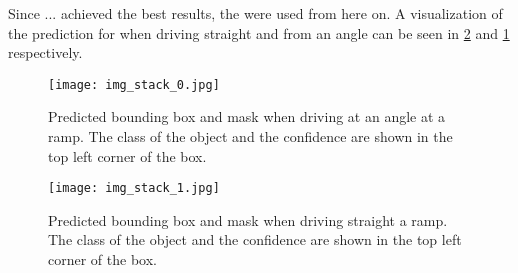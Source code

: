 Since ... achieved the best results, the were used from here on.
A visualization of the prediction for when driving straight and from an angle can be seen in \cref{fig:camera_detection_compare2} and \cref{fig:camera_detection_compare} respectively.
\begin{figure}[htb]
	\centering
	\texttt{[image: img\_stack\_0.jpg]}
	\caption{Predicted bounding box and mask when driving at an angle at a ramp. The class of the object and the confidence are shown in the top left corner of the box.}
	\label{fig:camera_detection_compare}
\end{figure}
\begin{figure}[htb]
	\centering
	\texttt{[image: img\_stack\_1.jpg]}
	\caption{Predicted bounding box and mask when driving straight a ramp. The class of the object and the confidence are shown in the top left corner of the box.}
	\label{fig:camera_detection_compare2}
\end{figure}


